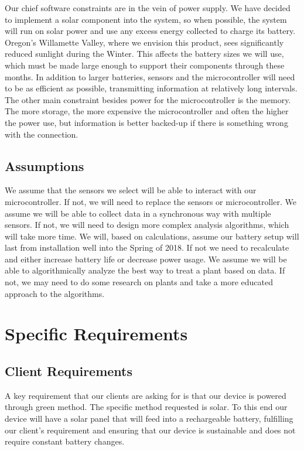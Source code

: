 \documentclass[IEEEtran,letterpaper,10pt,titlepage,fleqn,draftclsnofoot,onecolumn]{article}
\begin{document}
Our chief software constraints are in the vein of power supply. We have decided to implement a solar component into the system, so when possible, the system will run on solar power and use any excess energy collected to charge its battery. Oregon’s Willamette Valley, where we envision this product, sees significantly reduced sunlight during the Winter. This affects the battery sizes we will use, which must be made large enough to support their components through these months. In addition to larger batteries, sensors and the microcontroller will need to be as efficient as possible, transmitting information at relatively long intervals. The other main constraint besides power for the microcontroller is the memory. The more storage, the more expensive the microcontroller and often the higher the power use, but information is better backed-up if there is something wrong with the connection.   

\subsection{Assumptions}

We assume that the sensors we select will be able to interact with our microcontroller. If not, we will need to replace the sensors or microcontroller. We assume we will be able to collect data in a synchronous way with multiple sensors. If not, we will need to design more complex analysis algorithms, which will take more time. We will, based on calculations, assume our battery setup will last from installation well into the Spring of 2018. If not we need to recalculate and either increase battery life or decrease power usage. We assume we will be able to algorithmically analyze the best way to treat a plant based on data. If not, we may need to do some research on plants and take a more educated approach to the algorithms.

\clearpage

\section{Specific Requirements}
\subsection{Client Requirements}

A key requirement that our clients are asking for is that our device is powered through green method. The specific method requested is solar. To this end our device will have a solar panel that will feed into a rechargeable battery, fulfilling our client’s requirement and ensuring that our device is sustainable and does not require constant battery changes.
\end{document}
